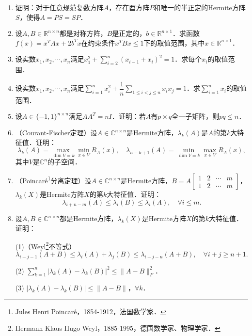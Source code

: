 \documentclass[a4paper,fontset=windows]{ctexbook}
\theoremstyle{definition}
\renewcommand{\le}{\leqslant}
\renewcommand{\ge}{\geqslant}
\begin{document}
\begin{enumerate}
\item 证明：对于任意规范复数方阵$A$，存在酉方阵$P$和唯一的半正定的Hermite方阵$S$，使得$A=PS=SP$．

\item 设$A,B\in\mathbb{R}^{n\times n}$都是对称方阵，$B$是正定的，$b\in\mathbb{R}^{n\times 1}$．求函数$f(x)=x^TAx+2b^Tx$在约束条件$x^TBx\le 1$下的取值范围，其中$x\in\mathbb{R}^{n\times 1}$．

\item 设实数$x_1,x_2,\cdots,x_n$满足$x_1^2+\sum\limits_{i=2}^n(x_{i-1}+x_i)^2=1$．求每个$x_i$的取值范围．

\item 设实数$x_1,x_2,\cdots,x_n$满足$\sum\limits_{i=1}^nx_i^2+\dfrac{1}{n}\sum\limits_{1\le i<j\le n}x_ix_j=1$．求$\sum\limits_{i=1}^nx_i$的取值范围．

\item 设$A\in\{-1,1\}^{n\times n}$满足$AA^T=nI$．证明：若$A$有$p\times q$全一子矩阵，则$pq\le n$．

\item（Courant-Fischer定理）设$A\in\mathbb{C}^{n\times n}$是Hermite方阵，$\lambda_k(A)$是$A$的第$k$大特征值．证明：
$$\lambda_k(A)=\max_{\dim V=k}\min_{x\in V}R_A(x), \quad
\lambda_{n-k+1}(A)=\min_{\dim V=k}\max_{x\in V}R_A(x),$$
其中$V$是$\mathbb{C}^n$的子空间．

\item （Poincar\'e\footnote{Jules Henri Poincar\'e，1854-1912，法国数学家．}分离定理）设$A\in\mathbb{C}^{n\times n}$是Hermite方阵，$B=A[\begin{smallmatrix}1&2&\cdots&m \\ 1&2&\cdots&m\end{smallmatrix}]$，$\lambda_k(X)$是Hermite方阵$X$的第$k$大特征值．证明：
$$\lambda_{i+n-m}(A)\le\lambda_i(B)\le\lambda_i(A),\quad\forall i\le m.$$

\item 设$A,B\in\mathbb{C}^{n\times n}$都是Hermite方阵，$\lambda_k(X)$是Hermite方阵$X$的第$k$大特征值．证明：

(1)（Weyl\footnote{Hermann Klaus Hugo Weyl，1885-1995，德国数学家、物理学家．}不等式）
$$\lambda_{i+j-1}(A+B)\le\lambda_i(A)+\lambda_j(B)\le\lambda_{i+j-n}(A+B),\quad\forall i+j\ge n+1.$$

(2) $\sum\limits_{k=1}^n|\lambda_k(A)-\lambda_k(B)|^2\le\|A-B\|_F^2$．

(3) $|\lambda_k(A)-\lambda_k(B)|\le\|A-B\|$，$\forall k$．


\end{enumerate}
\end{document}
